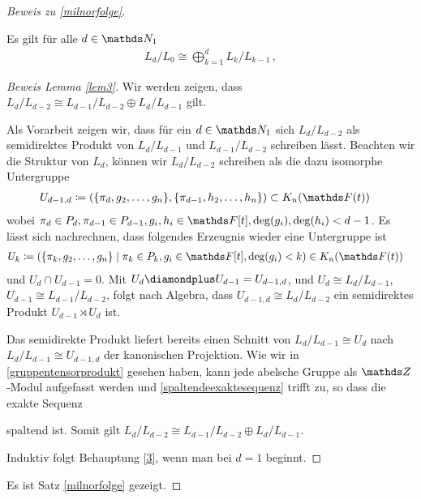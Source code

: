 \documentclass[ngerman,fontsize=11pt, paper=a4, parskip=half, titlepage=true, toc=bib]{scrartcl}
\begin{document}
\begin{proof}[Beweis zu \ref{milnorfolge}]
  \begin{Lem}\label{lem3}
    Es gilt für alle $d\in\N_1$
    \begin{gather}
      L_d/L_0\cong \bigoplus_{k=1}^d L_k/L_{k-1} \,,
    \end{gather}
  \end{Lem}
  \begin{proof}[Beweis Lemma \ref{lem3}]
    Wir werden zeigen, dass $L_d/L_{d-2}\cong L_{d-1}/L_{d-2}\oplus
    L_{d}/L_{d-1}$ gilt.
    
    Als Vorarbeit zeigen wir, dass für ein $d\in\N_1$ sich
    $L_d/L_{d-2}$ als semidirektes Produkt von $L_d/L_{d-1}$ und
    $L_{d-1}/L_{d-2}$ schreiben lässt.
    Beachten wir die Struktur von $L_d$, können wir $L_d/L_{d-2}$
    schreiben als die dazu isomorphe Untergruppe 
    \begin{align*}
      U_{d-1,d}
      &\coloneqq \left(
        \{\pi_d,g_2,\dotsc,g_n\},
        \{\pi_{d-1},h_2,\dotsc,h_n\}
        \right)\subset\KnFt
    \end{align*}
    wobei $\pi_{d}\in P_d, \pi_{d-1}\in P_{d-1}, 
    g_i,h_i\in\F[t],\deg(g_i),\deg(h_i)<d-1$.
    Es lässt sich nachrechnen, dass folgendes Erzeugnis wieder eine
    Untergruppe ist
    \begin{align*}
      U_k&\coloneqq \left(\{\pi_k,g_2,\dotsc,g_n\}
           \mid \pi_{k}\in P_k, g_i\in\F[t],\deg(g_i)<k
           \right)\in\KnFt
    \end{align*}
    und $U_d\cap U_{d-1}=0$.
    Mit $U_d\p U_{d-1}= U_{d-1,d}$,
    und $U_d\cong L_d/L_{d-1}$, $U_{d-1}\cong L_{d-1}/L_{d-2}$,
    folgt nach Algebra, dass
    $U_{d-1,d}\cong L_d/L_{d-2}$ ein semidirektes Produkt $U_{d-1}\rtimes U_{d}$
    ist.

    Das semidirekte Produkt liefert bereits einen Schnitt von
    $L_{d}/L_{d-1}\cong U_{d}$ nach $L_d/L_{d-1}\cong U_{d-1,d}$
    der kanonischen Projektion.
    Wie wir in \ref{gruppentensorprodukt} gesehen haben, kann jede
    abelsche Gruppe als $\Z$-Modul aufgefasst werden und \ref{spaltendeexaktesequenz}
    trifft zu, so dass die exakte Sequenz
    \begin{center}
    \end{center}
    spaltend ist. Somit gilt $L_d/L_{d-2}\cong L_{d-1}/L_{d-2}\oplus
    L_d/L_{d-1}$.
    
    Induktiv folgt Behauptung \eqref{3}, wenn man bei $d=1$ beginnt.
  \end{proof}
  
  Es ist Satz \ref{milnorfolge} gezeigt.
\end{proof}


\printindex

\nocite{*}
\printbibliography
\end{document}
